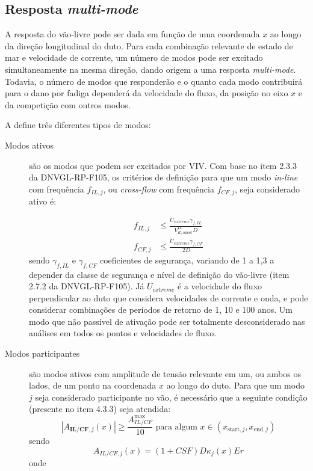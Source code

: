 \subsection{Resposta \textit{multi-mode}}\label{sec:multimode}


A resposta do vão-livre pode ser dada em função de uma coordenada $x$ ao longo da direção longitudinal do duto.
Para cada combinação relevante de estado de mar e velocidade de corrente, um número de modos pode ser excitado simultaneamente na mesma direção, dando origem a uma resposta \textit{multi-mode}.
Todavia, o número de modos que responderão e o quanto cada modo contribuirá para o dano por fadiga dependerá da velocidade do fluxo, da posição no eixo $x$ e da competição com outros modos.

A  define três diferentes tipos de modos:
\begin{description}
	\item[Modos ativos] são os modos que podem ser excitados por VIV\@. Com base no item 2.3.3 da DNVGL-RP-F105, os critérios de definição para que um modo \textit{in-line} com frequência $f_{IL,j}$, ou \textit{cross-flow} com frequência $f_{CF,j}$, seja considerado ativo é:

    \begin{equation}
        \begin{aligned}
        f_{I L, j} & \leq \frac{U_{extreme} \gamma_{f,IL}}{V_{R,\text{onset}}^{IL} D} \\
        f_{C F, j} & \leq \frac{U_{extreme} \gamma_{f,CF}}{2D}
        \end{aligned}
    \end{equation}
    sendo $\gamma_{f,IL}$ e $\gamma_{f,CF}$ coeficientes de segurança, variando de 1 a 1,3 a depender da classe de segurança e nível de
    definição do vão-livre (item 2.7.2 da DNVGL-RP-F105). Já $U_{extreme}$ é a velocidade do fluxo perpendicular ao duto que considera velocidades de corrente e onda, e pode considerar combinações de períodos de retorno de 1, 10 e 100 anos.
    Um modo que não passível de ativação pode ser totalmente desconsiderado nas análises em todos os pontos e velocidades de fluxo.

    \item[Modos participantes] são modos ativos com amplitude de tensão relevante em um, ou ambos os lados, de um ponto na coordenada $x$ ao longo do duto. Para que um modo $j$ seja considerado participante no vão, é necessário que a seguinte condição (presente no item 4.3.3) seja atendida:
    \[
    \left|A_{\textbf{IL/CF}, j}(x)\right| \geq \frac{A_{IL/CF}^{\max}}{10} \text{ para algum } x \in (x_{\text{start},j}, x_{\text{end}, j})
    \]
    sendo
    \[
    A_{IL/CF, j}(x) = (1+CSF) D \kappa_{j}(x) E r
    \]
    onde


\end{description}
